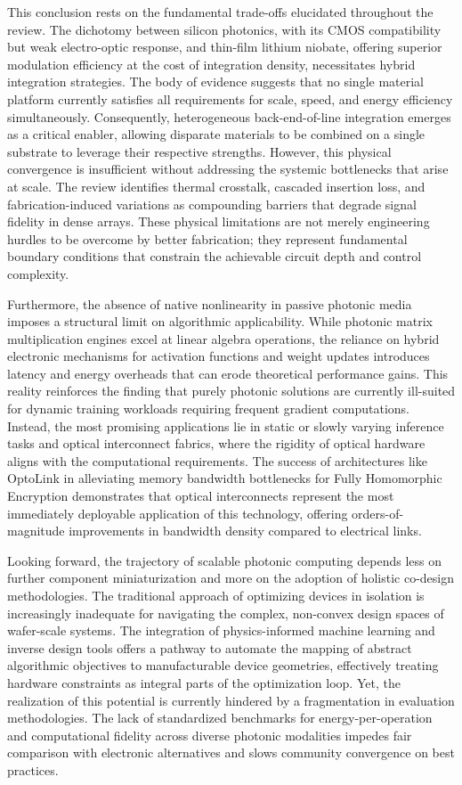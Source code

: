 This conclusion rests on the fundamental trade-offs elucidated throughout the review. The dichotomy between silicon photonics, with its CMOS compatibility but weak electro-optic response, and thin-film lithium niobate, offering superior modulation efficiency at the cost of integration density, necessitates hybrid integration strategies. The body of evidence suggests that no single material platform currently satisfies all requirements for scale, speed, and energy efficiency simultaneously. Consequently, heterogeneous back-end-of-line integration emerges as a critical enabler, allowing disparate materials to be combined on a single substrate to leverage their respective strengths. However, this physical convergence is insufficient without addressing the systemic bottlenecks that arise at scale. The review identifies thermal crosstalk, cascaded insertion loss, and fabrication-induced variations as compounding barriers that degrade signal fidelity in dense arrays. These physical limitations are not merely engineering hurdles to be overcome by better fabrication; they represent fundamental boundary conditions that constrain the achievable circuit depth and control complexity.

Furthermore, the absence of native nonlinearity in passive photonic media imposes a structural limit on algorithmic applicability. While photonic matrix multiplication engines excel at linear algebra operations, the reliance on hybrid electronic mechanisms for activation functions and weight updates introduces latency and energy overheads that can erode theoretical performance gains. This reality reinforces the finding that purely photonic solutions are currently ill-suited for dynamic training workloads requiring frequent gradient computations. Instead, the most promising applications lie in static or slowly varying inference tasks and optical interconnect fabrics, where the rigidity of optical hardware aligns with the computational requirements. The success of architectures like OptoLink in alleviating memory bandwidth bottlenecks for Fully Homomorphic Encryption demonstrates that optical interconnects represent the most immediately deployable application of this technology, offering orders-of-magnitude improvements in bandwidth density compared to electrical links.

Looking forward, the trajectory of scalable photonic computing depends less on further component miniaturization and more on the adoption of holistic co-design methodologies. The traditional approach of optimizing devices in isolation is increasingly inadequate for navigating the complex, non-convex design spaces of wafer-scale systems. The integration of physics-informed machine learning and inverse design tools offers a pathway to automate the mapping of abstract algorithmic objectives to manufacturable device geometries, effectively treating hardware constraints as integral parts of the optimization loop. Yet, the realization of this potential is currently hindered by a fragmentation in evaluation methodologies. The lack of standardized benchmarks for energy-per-operation and computational fidelity across diverse photonic modalities impedes fair comparison with electronic alternatives and slows community convergence on best practices.


